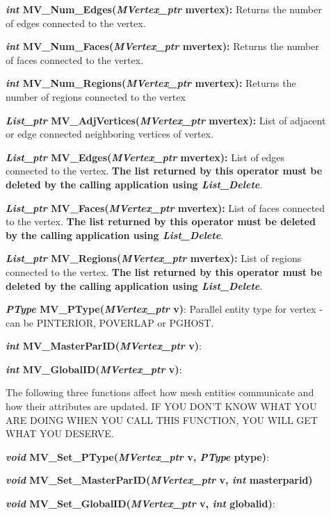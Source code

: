\documentclass[12pt]{article}
\begin{document}
\begin{description}
\item[]{\bf {\em int} MV\_Num\_Edges({\em MVertex\_ptr} mvertex):}
Returns the number of edges connected to the vertex.

\item[]{\bf {\em int} MV\_Num\_Faces({\em MVertex\_ptr} mvertex):}
Returns the number of faces connected to the vertex.

\item[]{\bf {\em int} MV\_Num\_Regions({\em MVertex\_ptr} mvertex):}
Returns the number of regions connected to the vertex

\item[]{\bf {\em List\_ptr} MV\_AdjVertices({\em MVertex\_ptr}
mvertex):} List of adjacent or edge connected neighboring vertices of vertex.

\item[]{\bf {\em List\_ptr} MV\_Edges({\em MVertex\_ptr} mvertex):}
List of edges connected to the vertex. {\bf The list returned by this
  operator must be deleted by the calling application using {\em List\_Delete}}.

\item[]{\bf {\em List\_ptr} MV\_Faces({\em MVertex\_ptr} mvertex):}
List of faces connected to the vertex. {\bf The list returned by this
  operator must be deleted by the calling application using {\em List\_Delete}}.

\item[]{\bf {\em List\_ptr} MV\_Regions({\em MVertex\_ptr} mvertex):}
List of regions connected to the vertex. {\bf The list returned by this
  operator must be deleted by the calling application using {\em List\_Delete}}.

\item[]

\item[]  {\bf {\em PType} MV\_PType({\em MVertex\_ptr} v)}: Parallel entity type for vertex - can be PINTERIOR, POVERLAP or PGHOST.
\item[]  {\bf {\em int}   MV\_MasterParID({\em MVertex\_ptr} v)}:
\item[]  {\bf {\em int}   MV\_GlobalID({\em MVertex\_ptr} v)}:

\item[]
\item[]  The following three functions affect how mesh entities communicate and how their attributes are updated. IF YOU DON'T KNOW WHAT YOU ARE DOING WHEN YOU CALL THIS FUNCTION, YOU WILL GET WHAT YOU DESERVE.
\item[]  {\bf {\em void}  MV\_Set\_PType({\em MVertex\_ptr} v, {\em PType} ptype)}: 
\item[]  {\bf {\em void}  MV\_Set\_MasterParID({\em MVertex\_ptr} v, {\em int} masterparid)}
\item[]  {\bf {\em void}  MV\_Set\_GlobalID({\em MVertex\_ptr} v, {\em int} globalid)}:  


\end{description}
\end{document}
